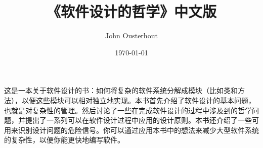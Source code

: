 \documentclass[UTF8,oneside,A4paper]{ctexbook}
\begin{document}
% 

\frontmatter
\title{《软件设计的哲学》中文版}
\author{ John Ousterhout }
\date{\today}
\maketitle %
这是一本关于软件设计的书：如何将复杂的软件系统分解成模块（比如类和方法），以便这些模块可以相对独立地实现。本书首先介绍了软件设计的基本问题，也就是对复杂性的管理。然后讨论了一些在完成软件设计的过程中涉及到的哲学问题，并提出了一系列可以在软件设计过程中应用的设计原则。本书还介绍了一些可用来识别设计问题的危险信号。你可以通过应用本书中的想法来减少大型软件系统的复杂性，以便你能更快地编写软件。


\tableofcontents
\mainmatter
























\end{document}

